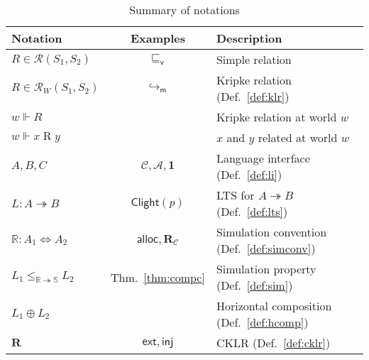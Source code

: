 \documentclass[sigplan,10pt,review,anonymous]{acmart}
\newcommand{\kw}[1]{\ensuremath{ \mathsf{#1} }}
\newcommand{\que}{\circ}
\newcommand{\ans}{\bullet}
\newcommand{\vref}{\sqsubseteq_\kw{v}}
\begin{document}



\begin{table} %
  \small
  \begin{tabular}{lcl}
    \hline
    Notation & Examples & Description \\
    \hline
    $R \in \mathcal{R}(S_1, S_2)$ &
      $\vref$ &
      Simple relation \\
    $R \in \mathcal{R}_W(S_1, S_2)$ &
      $\hookrightarrow_\kw{m}$ &
      Kripke relation (Def.~\ref{def:klr}) \\
    $w \Vdash R$ & &
      Kripke relation at world $w$ \\
    $w \Vdash x \mathrel{R} y$ & &
      $x$ and $y$ related at world $w$ \\
    \hline
    $A, B, C$ &
      $\mathcal{C}, \mathcal{A}, \mathbf{1}$ &
      Language interface (Def.~\ref{def:li}) \\
    $L : A \twoheadrightarrow B$ &
      $\kw{Clight}(p)$ &
      LTS for $A \twoheadrightarrow B$ (Def.~\ref{def:lts}) \\
    $\mathbb{R} : A_1 \Leftrightarrow A_2$ &
      $\kw{alloc}, \mathbf{R}_\mathcal{C}$ &
      Simulation convention (Def.~\ref{def:simconv}) \\
    $L_1 \le_{\mathbb{R} \twoheadrightarrow \mathbb{S}} L_2$ &
      Thm.~\ref{thm:compc} &
      Simulation property (Def.~\ref{def:sim}) \\
    $L_1 \oplus L_2$ & &
      Horizontal composition (Def.~\ref{def:hcomp}) \\
    $\mathbf{R}$ &
      $\kw{ext}, \kw{inj}$ &
      CKLR (Def.~\ref{def:cklr}) \\
    \hline
  \end{tabular}
  \caption{Summary of notations}
  \label{tbl:notations}
\end{table}
\end{document}
